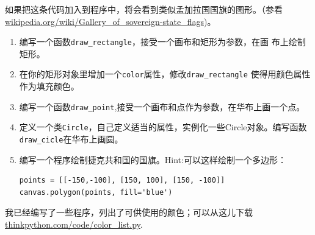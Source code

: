 \begin{ex}
如果把这条代码加入到程序中，将会看到类似孟加拉国国旗的图形。（参看\url{wikipedia.org/wiki/Gallery_of_sovereign-state_flags})。

\begin{enumerate}

\item 编写一个函数\verb"draw_rectangle"，接受一个画布和矩形为参数，在画
布上绘制矩形。

\item 在你的矩形对象里增加一个{\tt color}属性，修改\verb"draw_rectangle" 使得用颜色属性作为填充颜色。

\item 编写一个函数\verb"draw_point",接受一个画布和点作为参数，在华布上画一个点。

\item 定义一个类{\tt Circle}，自己定义适当的属性，实例化一些Circle对象。编写函数\verb"draw_cicle"在华布上画圆。


\item 编写一个程序绘制捷克共和国的国旗。Hint:可以这样绘制一个多边形：

\beforeverb
\begin{verbatim}
points = [[-150,-100], [150, 100], [150, -100]]
canvas.polygon(points, fill='blue')
\end{verbatim}
\afterverb

\end{enumerate}


我已经编写了一些程序，列出了可供使用的颜色；可以从这儿下载\url{thinkpython.com/code/color_list.py}.
\end{ex}




































